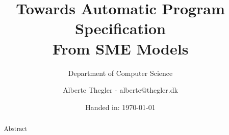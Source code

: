 \documentclass[a4paper]{report}
\author{Alberte Thegler - alberte@thegler.dk}
\title{Towards Automatic Program Specification \\ From SME Models}
\subtitle{Department of Computer Science}
\date{Handed in: \today}
\begin{document}
\maketitle

\begin{abstract}
\begin{doublespace}
Abstract
\end{doublespace}
\end{abstract}


\newpage
\tableofcontents

\newpage
{}



% 
%
%
% 
%
% 
%
% 
% 
% 
\end{document}
